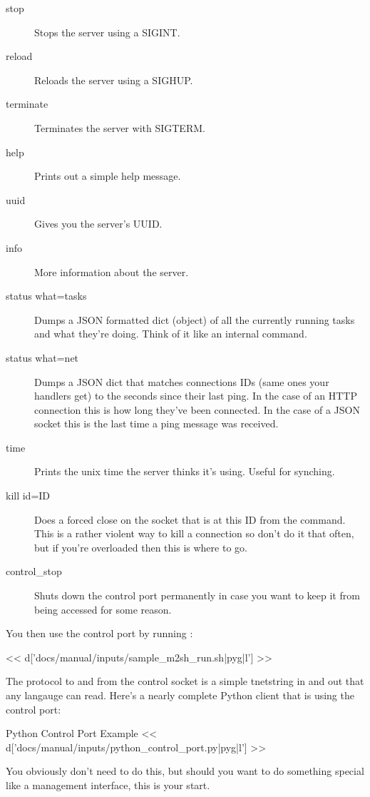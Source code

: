 \begin{description}
\item[stop] Stops the server using a SIGINT.
\item[reload] Reloads the server using a SIGHUP.
\item[terminate] Terminates the server with SIGTERM.
\item[help] Prints out a simple help message.
\item[uuid] Gives you the server's UUID.
\item[info] More information about the server.
\item[status what=tasks] Dumps a JSON formatted dict (object) of all the currently
    running tasks and what they're doing.  Think of it like an internal 
    command.
\item[status what=net] Dumps a JSON dict that matches connections IDs (same ones your
        handlers get) to the seconds since their last ping.  In the case of an
        HTTP connection this is how long they've been connected.  In the case
        of a JSON socket this is the last time a ping message was received.
\item[time] Prints the unix time the server thinks it's using.  Useful for synching.
\item[kill id=ID] Does a forced close on the socket that is at this ID from the 
    command.  This is a rather violent way to kill a connection so don't do it that
    often, but if you're overloaded then this is where to go.
\item[control\_stop] Shuts down the control port permanently in case you want to keep
    it from being accessed for some reason.
\end{description}

You then use the control port by running :

<< d['docs/manual/inputs/sample_m2sh_run.sh|pyg|l'] >>

The protocol to and from the control socket is a simple tnetstring in and out that 
any langauge can read.  Here's a nearly complete Python client that is using
the control port:

\begin{code}{Python Control Port Example}
<< d['docs/manual/inputs/python_control_port.py|pyg|l'] >>
\end{code}

You obviously don't need to do this, but should you want to do
something special like a management interface, this is your start.


